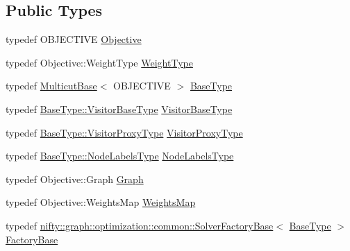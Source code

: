 \subsection*{Public Types}
\begin{DoxyCompactItemize}
\item 
typedef O\+B\+J\+E\+C\+T\+I\+V\+E \hyperlink{classnifty_1_1graph_1_1optimization_1_1multicut_1_1MulticutDecomposer_ac952e35144b62e74a0ab4e08a4fbb123}{Objective}
\item 
typedef Objective\+::\+Weight\+Type \hyperlink{classnifty_1_1graph_1_1optimization_1_1multicut_1_1MulticutDecomposer_a53574e582133a64729724c47244450b1}{Weight\+Type}
\item 
typedef \hyperlink{classnifty_1_1graph_1_1optimization_1_1multicut_1_1MulticutBase}{Multicut\+Base}$<$ O\+B\+J\+E\+C\+T\+I\+V\+E $>$ \hyperlink{classnifty_1_1graph_1_1optimization_1_1multicut_1_1MulticutDecomposer_acc1a1f33f65811d3be3ae2b819d8470d}{Base\+Type}
\item 
typedef \hyperlink{classnifty_1_1graph_1_1optimization_1_1common_1_1SolverBase_a5a14d64c70a9cc0eebc7d71d2b089f9b}{Base\+Type\+::\+Visitor\+Base\+Type} \hyperlink{classnifty_1_1graph_1_1optimization_1_1multicut_1_1MulticutDecomposer_ad1f4a09f99e9fa5ba8ae1bf3227c18f3}{Visitor\+Base\+Type}
\item 
typedef \hyperlink{classnifty_1_1graph_1_1optimization_1_1common_1_1SolverBase_a58913ea9ab9232ff72608b710c1012d0}{Base\+Type\+::\+Visitor\+Proxy\+Type} \hyperlink{classnifty_1_1graph_1_1optimization_1_1multicut_1_1MulticutDecomposer_a53a9d7161f78a1857add8e82d05fbd70}{Visitor\+Proxy\+Type}
\item 
typedef \hyperlink{classnifty_1_1graph_1_1optimization_1_1common_1_1SolverBase_a6e4e465f3b6e039882669fcfb9714818}{Base\+Type\+::\+Node\+Labels\+Type} \hyperlink{classnifty_1_1graph_1_1optimization_1_1multicut_1_1MulticutDecomposer_a393f1194615c399b2bbb591c764d036f}{Node\+Labels\+Type}
\item 
typedef Objective\+::\+Graph \hyperlink{classnifty_1_1graph_1_1optimization_1_1multicut_1_1MulticutDecomposer_aff933499d0ad72cbb45f308ac7cd054d}{Graph}
\item 
typedef Objective\+::\+Weights\+Map \hyperlink{classnifty_1_1graph_1_1optimization_1_1multicut_1_1MulticutDecomposer_a057405459f7f484d39c46c4a58fb34df}{Weights\+Map}
\item 
typedef \hyperlink{classnifty_1_1graph_1_1optimization_1_1common_1_1SolverFactoryBase}{nifty\+::graph\+::optimization\+::common\+::\+Solver\+Factory\+Base}$<$ \hyperlink{classnifty_1_1graph_1_1optimization_1_1multicut_1_1MulticutDecomposer_acc1a1f33f65811d3be3ae2b819d8470d}{Base\+Type} $>$ \hyperlink{classnifty_1_1graph_1_1optimization_1_1multicut_1_1MulticutDecomposer_abe39b7b32f6d3b6f01d24e0d298f759a}{Factory\+Base}

\end{DoxyCompactItemize}

